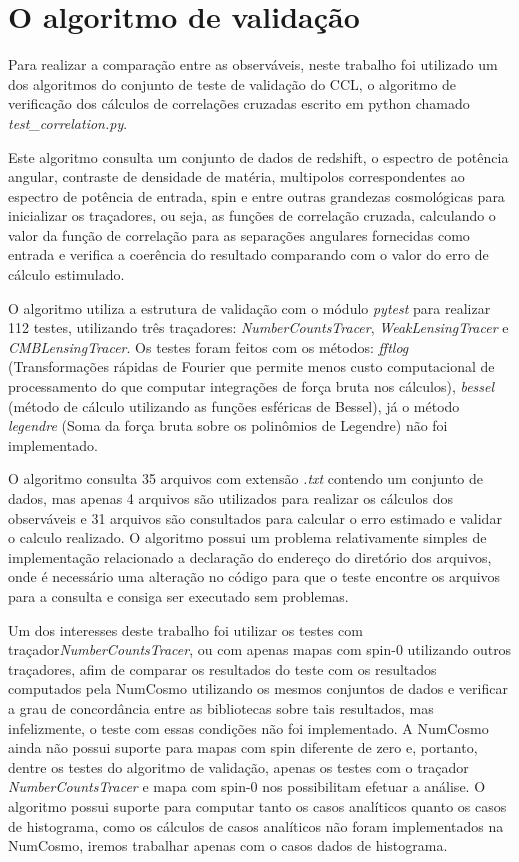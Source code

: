 \section*{O algoritmo de validação}

Para realizar a comparação entre as observáveis, neste trabalho foi utilizado um dos algoritmos do conjunto de teste de validação do CCL, o algoritmo de verificação dos cálculos de correlações cruzadas escrito em python chamado  \textit{test\_correlation.py}.

Este algoritmo consulta um conjunto de dados de redshift, o espectro de potência angular, contraste de densidade de matéria, multipolos correspondentes ao espectro de potência de entrada, spin e entre outras grandezas cosmológicas para inicializar os traçadores, ou seja, as funções de correlação cruzada, calculando o valor da função de correlação para as separações angulares fornecidas como entrada e verifica a coerência do resultado comparando com o valor do erro de cálculo estimulado.

O algoritmo utiliza a estrutura de validação com o módulo \textit{pytest} para realizar 112 testes, utilizando três traçadores:  \textit{NumberCountsTracer}, \textit{WeakLensingTracer} e \textit{CMBLensingTracer}. Os testes foram feitos com os métodos: \textit{fftlog} (Transformações rápidas de Fourier que permite menos custo computacional de processamento do que computar integrações de força bruta nos cálculos), \textit{bessel} (método de cálculo utilizando as funções esféricas de Bessel), já o método \textit{legendre} (Soma da força bruta sobre os polinômios de Legendre) não foi implementado.

O algoritmo consulta 35 arquivos com extensão \textit{.txt} contendo um conjunto de dados, mas apenas 4 arquivos são utilizados para realizar os cálculos dos observáveis e 31 arquivos são consultados para calcular o erro estimado e validar o calculo realizado. O algoritmo possui um problema relativamente simples de implementação relacionado a declaração do endereço do diretório dos arquivos, onde é necessário uma alteração no código para que o teste encontre os arquivos para a consulta e consiga ser executado sem problemas. 

Um dos interesses deste trabalho foi utilizar os testes com traçador\textit{NumberCountsTracer}, ou com apenas mapas com spin-0 utilizando outros traçadores, afim de comparar os resultados do teste com os resultados computados pela NumCosmo utilizando os mesmos conjuntos de dados e verificar a grau de concordância entre as bibliotecas sobre tais resultados, mas infelizmente, o teste com essas condições não foi implementado. A NumCosmo ainda não possui suporte para mapas com spin diferente de zero e, portanto, dentre os testes do algoritmo de validação, apenas os testes com o traçador  \textit{NumberCountsTracer} e mapa com spin-0 nos possibilitam efetuar a análise. O algoritmo possui suporte para computar tanto os casos analíticos quanto os casos de histograma, como os cálculos de casos analíticos não foram implementados na NumCosmo, iremos trabalhar apenas com o casos dados de histograma.

